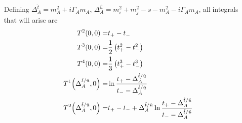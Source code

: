 \documentclass[../main.tex]{subfiles}
\begin{document}
Defining \(\Delta_A^{\hat{t}} = m_A^2 + i\Gamma_A m_A\), \(\Delta_A^{\hat{u}} =
m_i^2 + m_j^2 - s - m_A^2 - i\Gamma_A m_A\), all integrals that will arise are
\begin{subequations}
	\begin{align}
		T^2(0, 0) =                                                             & t_+ - t_-                                                                                                                                                                                                                                                                                                                                                 \\
		T^3(0, 0) =                                                             & \frac{1}{2} \pclosed{t_+^2 - t_-^2}                                                                                                                                                                                                                                                                                                                       \\
		T^4(0, 0) =                                                             & \frac{1}{3} \pclosed{t_+^3 - t_-^3}                                                                                                                                                                                                                                                                                                                       \\
		T^1\!\pclosed{\Delta_A^{\hat{t}/\hat{u}}, 0} =                          & \ln\frac{t_+ - \Delta_A^{\hat{t}/\hat{u}}}{t_- - \Delta_A^{\hat{t}/\hat{u}}}                                                                                                                                                                                                                                                                              \\
		T^2\!\pclosed{\Delta_A^{\hat{t}/\hat{u}}, 0} =                          & t_+ - t_- + \Delta_A^{\hat{t}/\hat{u}} \ln\frac{t_+ - \Delta_A^{\hat{t}/\hat{u}}}{t_- - \Delta_A^{\hat{t}/\hat{u}}}                                                                                                                                                                                                                                       \\

\end{align}
\end{subequations}
\end{document}
